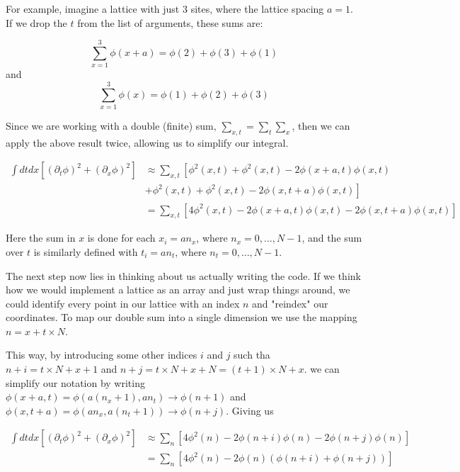 For example, imagine a lattice with just 3 sites, where the lattice spacing $a=1$.
If we drop the $t$ from the list of arguments, these sums are:

$$
\sum_{x=1}^{3} \phi(x+a) = \phi(2) + \phi(3) + \phi(1) 
$$
and
$$
\sum_{x=1}^{3} \phi(x) = \phi(1) + \phi(2) + \phi(3) 
$$

Since we are working with a double (finite) sum, $\sum_{x,t} = \sum_t \sum_x$, then we can apply the above result twice,
allowing us to simplify our integral.

\begin{equation}
\begin{aligned}
\int dt dx \left[ \left( \partial_t \phi \right)^2 + \left( \partial_x \phi \right)^2 \right] &\approx
\sum_{x,t} \left[ \phi^2 (x, t) + \phi^2 (x, t) - 2\phi(x+a, t) \phi(x, t) \right. \\
    & \left. + \phi^2 (x, t) + \phi^2 (x, t) - 2\phi(x, t+a) \phi(x, t) \right] \\
&= \sum_{x,t} \left[ 4\phi^2 (x, t) - 2\phi(x+a, t) \phi(x, t) - 2\phi(x, t+a) \phi(x, t) \right] \label{phi4:2d-kinetic-term}
\end{aligned}
\end{equation}

Here the sum in $x$ is done for each $x_i = an_x$, where $n_x = 0, \ldots, N-1$,
and the sum over $t$ is similarly defined with $t_i = an_t$, where $n_t = 0, \ldots , N-1$.

The next step now lies in thinking about us actually writing the code.
If we think how we would implement a lattice as an array and just wrap things around, we could identify every point in
our lattice with an index $n$ and "reindex" our coordinates.
To map our double sum into a single dimension we use the mapping $n = x + t\times N$.

This way, by introducing some other indices $i$ and $j$ such tha $n+i = t\times N + x + 1$ and
$n+j = t\times N + x + N = (t+1)\times N + x$.
we can simplify our notation by writing
$\phi(x+a, t) = \phi(a(n_x + 1), an_t) \rightarrow \phi(n+1)$ and
$\phi(x, t+a) = \phi(an_x, a(n_t + 1)) \rightarrow \phi(n+j)$.
Giving us

\begin{align*}
\int dt dx \left[ \left( \partial_t \phi \right)^2 + \left( \partial_x \phi \right)^2 \right] &\approx
    \sum_{n} \left[ 4\phi^2 (n) - 2\phi(n+i) \phi(n) - 2\phi(n+j) \phi(n) \right] \\
&= \sum_{n} \left[ 4\phi^2 (n) - 2\phi(n) \left( \phi(n+i) + \phi(n+j) \right) \right]
\end{align*}

